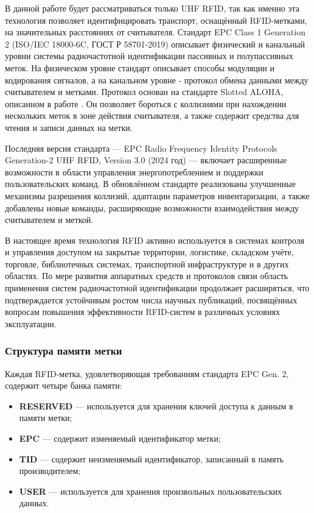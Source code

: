 \documentclass[12pt]{article}
\theoremstyle{definition}
\begin{document}
В данной работе будет рассматриваться только UHF RFID, так как именно эта технология позволяет идентифицировать транспорт, оснащённый RFID-метками, на значительных расстояниях от считывателя. Стандарт EPC Class 1 Generation 2 \cite{StdGen2} (ISO/IEC 18000-6C, ГОСТ Р 58701-2019) \cite{GostRfid} описывает физический и канальный уровни системы радиочастотной идентификации пассивных и полупассивных меток. На физическом уровне стандарт описывает способы модуляции и кодирования сигналов, а на канальном уровне - протокол обмена данными между считывателем и метками. Протокол основан на стандарте Slotted ALOHA, описанном в работе \cite{Abramson1970}. Он позволяет бороться с коллизиями при нахождении нескольких меток в зоне действия считывателя, а также содержит средства для чтения и записи данных на метки.

Последняя версия стандарта — EPC Radio Frequency Identity Protocols Generation-2 UHF RFID, Version 3.0 (2024 год) — включает расширенные возможности в области управления энергопотреблением и поддержки пользовательских команд. В обновлённом стандарте реализованы улучшенные механизмы разрешения коллизий, адаптации параметров инвентаризации, а также добавлены новые команды, расширяющие возможности взаимодействия между считывателем и меткой.

В настоящее время технология RFID активно используется в системах контроля и управления доступом на закрытые территории, логистике, складском учёте, торговле, библиотечных системах, транспортной инфраструктуре и в других областях. По мере развития аппаратных средств и протоколов связи область применения систем радиочастотной идентификации продолжает расширяться, что подтверждается устойчивым ростом числа научных публикаций, посвящённых вопросам повышения эффективности RFID-систем в различных условиях эксплуатации.

\subsubsection{Структура памяти метки}

Каждая RFID-метка, удовлетворяющая требованиям стандарта EPC Gen. 2, содержит четыре банка памяти:

\begin{itemize}
  \item \textbf{RESERVED} --- используется для хранения ключей доступа к данным в памяти метки;
  \item \textbf{EPC} --- содержит изменяемый идентификатор метки;
  \item \textbf{TID} --- содержит неизменяемый идентификатор, записанный в память производителем;
  \item \textbf{USER} --- используется для хранения произвольных пользовательских данных.
\end{itemize}
\end{document}
